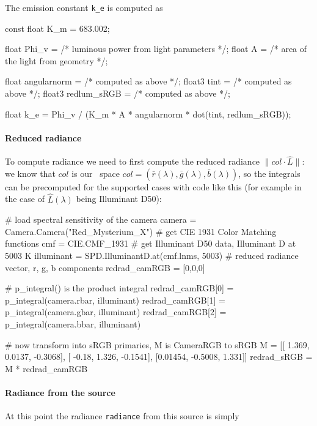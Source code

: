 The emission constant \Verb|k_e| is computed as

\begin{c++code}
const float K_m = 683.002;

float Phi_v = /* luminous power from light parameters */;
float A     = /* area of the light from geometry */;

float  angularnorm = /* computed as above */;
float3 tint        = /* computed as above */;
float3 redlum_sRGB = /* computed as above */;

float k_e = Phi_v / (K_m * A * angularnorm * dot(tint, redlum_sRGB));
\end{c++code}


\paragraph{Reduced radiance}

To compute radiance we need to first compute the reduced radiance $\|col\cdot
\hat L\|$: we know that $col$ is our \camRGBl\ space $col = (\bar r(\lambda),
\bar g(\lambda), \bar b(\lambda))$, so the integrals can be precomputed for the
supported cases with code like this (for example in the case of $\hat
L(\lambda)$ being Illuminant D50):

\begin{pythoncode}
# load spectral sensitivity of the camera
camera = Camera.Camera("Red_Mysterium_X")
# get CIE 1931 Color Matching functions
cmf = CIE.CMF_1931
# get Illuminant D50 data, Illuminant D at 5003 K
illuminant = SPD.IlluminantD.at(cmf.lnms, 5003)
# reduced radiance vector, r, g, b components
redrad_camRGB = [0,0,0]

# p\_integral() is the product integral
redrad_camRGB[0] = p_integral(camera.rbar, illuminant)
redrad_camRGB[1] = p_integral(camera.gbar, illuminant)
redrad_camRGB[2] = p_integral(camera.bbar, illuminant)

# now transform into sRGB primaries, M is CameraRGB to sRGB
M = [[  1.369,  0.0137, -0.3068],
 [  -0.18,   1.326, -0.1541],
 [0.01454, -0.5008,   1.331]]
redrad_sRGB = M * redrad_camRGB

\end{pythoncode}

\paragraph{Radiance from the source}

At this point the radiance \Verb/radiance/ from this source is simply

